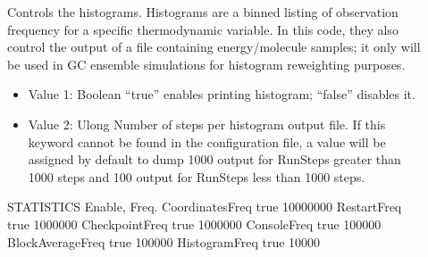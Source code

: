 \documentclass[letterpaper,10pt,english]{sphinxmanual}
\begin{document}
\begin{description}
\item[{}] \leavevmode
Controls the histograms. Histograms are a binned listing of observation frequency for a specific thermodynamic variable. In this code, they also control the output of a file containing energy/molecule samples; it only will be used in GC ensemble simulations for histogram reweighting purposes.
\begin{itemize}
\item {} 
Value 1: Boolean \sphinxhyphen{} “true” enables printing histogram; “false” disables it.

\item {} 
Value 2: Ulong \sphinxhyphen{} Number of steps per histogram output file. If this keyword cannot be found in the configuration file, a value will be assigned by default to dump 1000 output for RunSteps greater than 1000 steps and 100 output for RunSteps less than 1000 steps.

\end{itemize}

\begin{sphinxVerbatim}[commandchars=\\\{\}]
\PYGZsh{}\PYGZsh{}\PYGZsh{}\PYGZsh{}\PYGZsh{}\PYGZsh{}\PYGZsh{}\PYGZsh{}\PYGZsh{}\PYGZsh{}\PYGZsh{}\PYGZsh{}\PYGZsh{}\PYGZsh{}\PYGZsh{}\PYGZsh{}\PYGZsh{}\PYGZsh{}\PYGZsh{}\PYGZsh{}\PYGZsh{}\PYGZsh{}\PYGZsh{}\PYGZsh{}\PYGZsh{}\PYGZsh{}\PYGZsh{}\PYGZsh{}\PYGZsh{}\PYGZsh{}\PYGZsh{}\PYGZsh{}\PYGZsh{}
\PYGZsh{} STATISTICS Enable, Freq.
\PYGZsh{}\PYGZsh{}\PYGZsh{}\PYGZsh{}\PYGZsh{}\PYGZsh{}\PYGZsh{}\PYGZsh{}\PYGZsh{}\PYGZsh{}\PYGZsh{}\PYGZsh{}\PYGZsh{}\PYGZsh{}\PYGZsh{}\PYGZsh{}\PYGZsh{}\PYGZsh{}\PYGZsh{}\PYGZsh{}\PYGZsh{}\PYGZsh{}\PYGZsh{}\PYGZsh{}\PYGZsh{}\PYGZsh{}\PYGZsh{}\PYGZsh{}\PYGZsh{}\PYGZsh{}\PYGZsh{}\PYGZsh{}\PYGZsh{}
CoordinatesFreq   true 10000000
RestartFreq       true 1000000
CheckpointFreq    true 1000000
ConsoleFreq       true 100000
BlockAverageFreq  true 100000
HistogramFreq     true 10000
\end{sphinxVerbatim}

\end{description}
\end{document}
